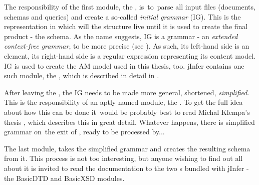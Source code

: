 The responsibility of the first module, the , is~to~parse all input files (documents, schemas and queries) and create a so-called \textit{initial grammar} (IG). 
This is the representation in which will the structure live until it is used to create the final product - the schema. As the name suggests, IG is a grammar - an \textit{extended context-free grammar}, to be more precise (see \cite{extendedcfg}). As such, its left-hand side is an element, its right-hand side is a regular expression representing its content model. IG is used to create the AM model used in this thesis, too. jInfer contains one such module, the , which is described in detail in \cite{basiciggdoc}.

After leaving the , the IG needs to be made more general, shortened, \textit{simplified}. This is the responsibility of an aptly named module, the . To get the full idea about how this can be done it~would be probably best to read Michal Klempa's thesis \cite{anti}, which describes this in great detail. Whatever happens, there is simplified grammar on~the exit of , ready to be processed by...

The last module,  takes the simplified grammar and creates the resulting schema from it. This process is not too interesting, but anyone wishing to find out all about it is invited to read the documentation to the two s bundled with jInfer - the BasicDTD and BasicXSD modules.
